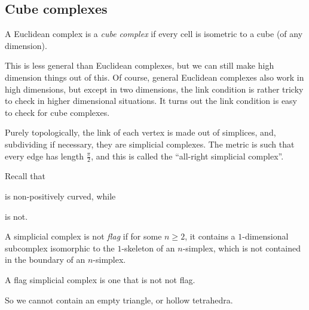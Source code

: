 \documentclass[a4paper]{article}
\begin{document}
\subsection{Cube complexes}
\begin{defi}
  A Euclidean complex is a \emph{cube complex} if every cell is isometric to a cube (of any dimension).
\end{defi}
This is less general than Euclidean complexes, but we can still make high dimension things out of this. Of course, general Euclidean complexes also work in high dimensions, but except in two dimensions, the link condition is rather tricky to check in higher dimensional situations. It turns out the link condition is easy to check for cube complexes.

Purely topologically, the link of each vertex is made out of simplices, and, subdividing if necessary, they are simplicial complexes. The metric is such that every edge has length $\frac{\pi}{2}$, and this is called the ``all-right simplicial complex''.

Recall that
\begin{center}
\end{center}
is non-positively curved, while
\begin{center}
\end{center}
is not.

\begin{defi}
  A simplicial complex is not \emph{flag} if for some $n \geq 2$, it contains a $1$-dimensional subcomplex isomorphic to the $1$-skeleton of an $n$-simplex, which is not contained in the boundary of an $n$-simplex.

  A flag simplicial complex is one that is not not flag.
\end{defi}
So we cannot contain an empty triangle, or hollow tetrahedra.
\end{document}
